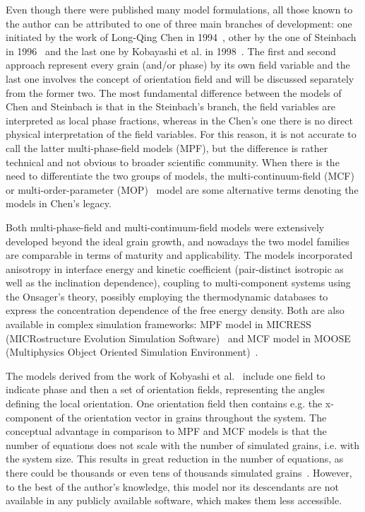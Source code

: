 	Even though there were published many model formulations, all those known to the author can be attributed to one of three main branches of development: one initiated by the work of Long-Qing Chen in 1994~\cite{Chen1994}, other by the one of Steinbach in 1996~\cite{Steinbach1996} and the last one by Kobayashi et al. in 1998~\cite{Kobayashi1998}. The first and second approach represent every grain (and/or phase) by its own field variable and the last one involves the concept of orientation field and will be discussed separately from the former two. The most fundamental difference between the models of Chen and Steinbach is that in the Steinbach's branch, the field variables are interpreted as local phase fractions, whereas in the Chen's one there is no direct physical interpretation of the field variables. For this reason, it is not accurate to call the latter multi-phase-field models (MPF), but the difference is rather technical and not obvious to broader scientific community. When there is the need to differentiate the two groups of models, the multi-continuum-field (MCF)~\cite{Moelans2009} or multi-order-parameter (MOP)~\cite{Toth2015,Daubner2023} model are some alternative terms denoting the models in Chen's legacy.
	
	Both multi-phase-field and multi-continuum-field models were extensively developed beyond the ideal grain growth, and nowadays the two model families are comparable in terms of maturity and applicability. The models incorporated anisotropy in interface energy and kinetic coefficient (pair-distinct isotropic as well as the inclination dependence), coupling to multi-component systems using the Onsager's theory, possibly employing the thermodynamic databases to express the concentration dependence of the free energy density. Both are also available in complex simulation frameworks: MPF model in MICRESS (MICRostructure Evolution Simulation Software)~\cite{Eiken2006} and MCF model in MOOSE (Multiphysics Object Oriented Simulation Environment)~\cite{Permann2020}.
	
	The models derived from the work of Kobyashi et al.~\cite{Kobayashi1998} include one field to indicate phase and then a set of orientation fields, representing the angles defining the local orientation. One orientation field then contains e.g. the x-component of the orientation vector in grains throughout the system. The conceptual advantage in comparison to MPF and MCF models is that the number of equations does not scale with the number of simulated grains, i.e. with the system size. This results in great reduction in the number of equations, as there could be thousands or even tens of thousands simulated grains~\cite{Yadav2016}. However, to the best of the author's knowledge, this model nor its descendants are not available in any publicly available software, which makes them less accessible.
	
